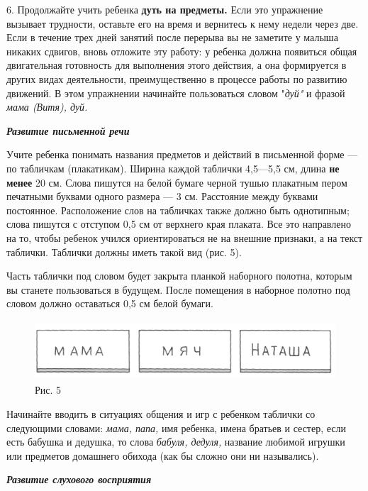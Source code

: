 \documentclass{book}
\renewcommand{\emph}[1]{\textit{#1}}
\begin{document}
6. Продолжайте учить ребенка \textbf{дуть на предметы.} Если это
упражнение вызывает трудности, оставьте его на время и вернитесь к нему
недели через две. Если в течение трех дней занятий после перерыва вы не
заметите у малыша никаких сдвигов, вновь отложите эту работу: у ребенка
должна появиться общая двигательная готовность для выполнения этого
действия, а она формируется в других видах деятельности, преимущественно
в процессе работы по развитию движений. В этом упражнении начинайте
пользоваться словом "\emph{дуй"} и фразой \emph{мама (Витя), дуй.}

\emph{\textbf{Развитие письменной речи}}

Учите ребенка понимать названия предметов и действий в письменной форме
--- по табличкам (плакатикам). Ширина каждой таблички 4,5---5,5 см,
длина \textbf{не менее} 20 см. Слова пишутся на белой бумаге черной
тушью плакатным пером печатными буквами одного размера --- 3 см.
Расстояние между буквами постоянное. Расположение слов на табличках
также должно быть однотипным; слова пишутся с отступом 0,5 см от
верхнего края плаката. Все это направлено на то, чтобы ребенок учился
ориентироваться не на внешние признаки, а на текст таблички. Таблички
должны иметь такой вид (рис. 5).

Часть таблички под словом будет закрыта планкой наборного полотна,
которым вы станете пользоваться в будущем. После помещения в наборное
полотно под словом должно оставаться 0,5 см белой бумаги.


\begin{figure}
\centering
\includegraphics[width=4.71319in,height=0.87361in]{media/media/image5.jpg}
\caption*{Рис. 5}
\end{figure}

Начинайте вводить в ситуациях общения и игр с ребенком таблички со
следующими словами: \emph{мама, папа,} имя ребенка, имена братьев и
сестер, если есть бабушка и дедушка, то слова \emph{бабуля, дедуля,}
название любимой игрушки или предметов домашнего обихода (как бы сложно
они ни назывались).

\emph{\textbf{Развитие слухового восприятия}}
\end{document}
